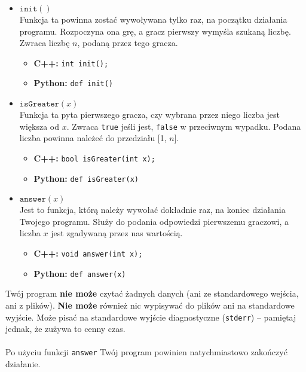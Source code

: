 \documentclass{spiral}
\begin{document}
    \begin{itemize}
        \item $\texttt{init}()$ \\
            Funkcja ta powinna zostać wywoływana
            tylko raz, na początku działania programu.
            Rozpoczyna ona grę, a gracz pierwszy wymyśla szukaną liczbę.
            Zwraca liczbę $n$, podaną przez tego gracza.
            \begin{itemize}
                \item \textbf{C++:}
		                \texttt{int init();}

                \item \textbf{Python:}
		                \texttt{def init()}
            \end{itemize}

        \item $\texttt{isGreater}(x)$ \\
            Funkcja ta pyta pierwszego gracza,
            czy wybrana przez niego liczba jest większa od $x$.
            Zwraca \texttt{true} jeśli jest, \texttt{false} w przeciwnym wypadku.
            Podana liczba powinna należeć do przedziału [1, $n$].
            \begin{itemize}
                \item \textbf{C++:}
		                \texttt{bool isGreater(int x);}

                \item \textbf{Python:}
		                \texttt{def isGreater(x)}
            \end{itemize}

        \item $\texttt{answer}(x)$ \\
            Jest to funkcja, którą należy wywołać dokładnie raz,
            na koniec działania Twojego programu.
            Służy do podania odpowiedzi pierwszemu graczowi,
            a liczba $x$ jest zgadywaną przez nas wartością.
            \begin{itemize}
                \item \textbf{C++:}
		                \texttt{void answer(int x);}
                \item \textbf{Python:}
		                \texttt{def answer(x)}
            \end{itemize}
    \end{itemize}

    \noindent Twój program \textbf{nie może} czytać żadnych danych
    (ani ze standardowego wejścia, ani z plików).
    \textbf{Nie może} również nic wypisywać do plików ani na standardowe wyjście.
    Może pisać na standardowe wyjście diagnostyczne
    (\texttt{stderr}) -- pamiętaj jednak, że zużywa to cenny czas.\\
    \\
    Po użyciu funkcji \texttt{answer} Twój program powinien
    natychmiastowo zakończyć działanie.
\end{document}
